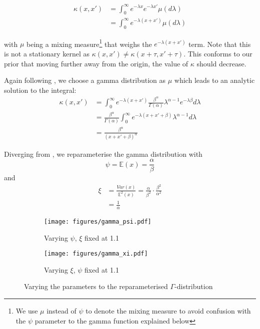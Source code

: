 \documentclass[a4paper,12pt,twoside,openright]{report}
\begin{document}
\begin{align}
\kappa(x,x') &= \int_{0}^{\infty} e^{-\lambda x}e^{-\lambda x'}\mu(d\lambda)\\
&= \int_{0}^{\infty} e^{-\lambda(x+x')}\mu(d\lambda)
\end{align}



with $\mu$ being a mixing measure\footnote{We use $\mu$ instead of $\psi$ to denote the mixing measure to avoid confusion with the $\psi$ parameter to the gamma function explained below} that weighs the $e^{-\lambda(x+x')}$ term. Note that this is not a stationary kernel as $\kappa(x, x') \neq \kappa(x + \tau, x' + \tau)$. This conforms to our prior that moving further away from the origin, the value of $\kappa$ should decrease.

Again following \cite{2014arXiv1406.3896S}, we choose a gamma distribution as $\mu$ which leads to an analytic solution to the integral:
\begin{align}
\kappa(x, x') &= \int_0^{\infty} e^{-\lambda(x+x')}\frac{\beta^\alpha}{\Gamma(\alpha)}\lambda^{\alpha -1}e^{-\lambda\beta} d\lambda\\
&=\frac{\beta^\alpha}{\Gamma(\alpha)}\int_0^\infty e^{-\lambda(x+x'+\beta)}\lambda^{\alpha-1}d\lambda\\
&=\frac{\beta^\alpha}{(x+x'+\beta)^\alpha}
\end{align}

Diverging from \cite{2014arXiv1406.3896S}, we reparameterise the gamma distribution with
\begin{equation}
\psi = \mathbb{E}(x) = \frac{\alpha}{\beta}
\end{equation}
and
\begin{align}
\xi &= \frac{Var(x)}{\mathbb{E}^2 (x)} = \frac{\alpha}{\beta^2} \cdot \frac{\beta^2}{\alpha^2}\\
&= \frac{1}{\alpha}
\end{align}

\begin{figure}
\centering
\begin{subfigure}{.5\textwidth}
  \centering
  \texttt{[image: figures/gamma\_psi.pdf]}
  \caption{Varying $\psi$, $\xi$ fixed at 1.1}
  \label{gammapsi}
\end{subfigure}%
\begin{subfigure}{.5\textwidth}
  \centering
  \texttt{[image: figures/gamma\_xi.pdf]}
  \caption{Varying $\xi$, $\psi$ fixed at 1.1}
  \label{gammaxi}
\end{subfigure}
\caption{Varying the parameters to the reparameterised $\Gamma$-distribution}
\label{gammadist}
\end{figure}
\end{document}
